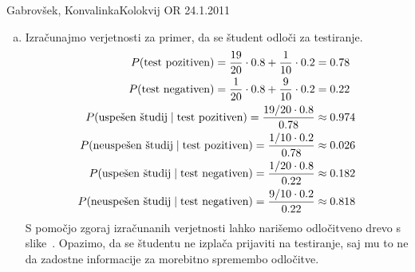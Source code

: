 \begin{naloga}{Gabrovšek, Konvalinka}{Kolokvij OR 24.1.2011}
\begin{odgovor}
\begin{enumerate}[(a)]
\item Izračunajmo verjetnosti za primer,
da se študent odloči za testiranje.
\begin{align*}
P(\text{test pozitiven}) =
{19 \over 20} \cdot 0.8 + {1 \over 10} \cdot 0.2 &= 0.78 \\
P(\text{test negativen}) =
{1 \over 20} \cdot 0.8 + {9 \over 10} \cdot 0.2 &= 0.22 \\
P(\text{uspešen študij} \mid \text{test pozitiven}) =
{19/20 \cdot 0.8 \over 0.78} &\approx 0.974 \\
P(\text{neuspešen študij} \mid \text{test pozitiven}) =
{1/10 \cdot 0.2 \over 0.78} &\approx 0.026 \\
P(\text{uspešen študij} \mid \text{test negativen}) =
{1/20 \cdot 0.8 \over 0.22} &\approx 0.182 \\
P(\text{neuspešen študij} \mid \text{test negativen}) =
{9/10 \cdot 0.2 \over 0.22} &\approx 0.818
\end{align*}
S pomočjo zgoraj izračunanih verjetnosti
lahko narišemo odločitveno drevo s slike~\fig.
Opazimo, da se študentu ne izplača prijaviti na testiranje,
saj mu to ne da zadostne informacije za morebitno spremembo odločitve.
\end{enumerate}
%
\begin{slika}
\makebox[\textwidth][c]{
\pgfslika
}
\end{slika}
\end{odgovor}
\end{naloga}
